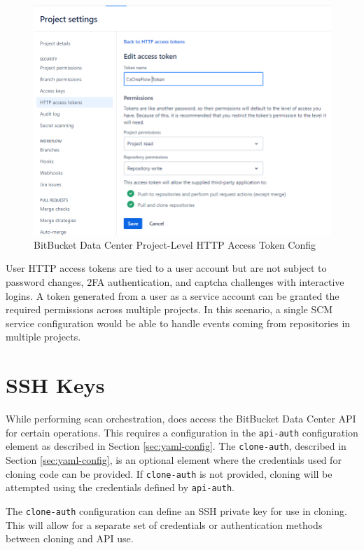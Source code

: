 \begin{figure}[ht]
    \includegraphics[width=\textwidth]{graphics/bbdc-token-config.png}
    \caption{BitBucket Data Center Project-Level HTTP Access Token Config}
    \label{fig:bbdc-token-config}
\end{figure}


User HTTP access tokens are tied to a user account but are not subject to password
changes, 2FA authentication, and captcha challenges with interactive logins.  A token generated
from a user as a service account can be granted the required permissions across multiple projects.
In this scenario, a single SCM service configuration would be able to handle events coming from
repositories in multiple projects.

\section{\cxoneflowtext\space SSH Keys}

While performing scan orchestration, \cxoneflow does access the BitBucket Data Center API for
certain operations.  This requires a configuration in the \texttt{api-auth} configuration
element as described in Section \ref{sec:yaml-config}.  The \texttt{clone-auth},
described in Section \ref{sec:yaml-config}, is an optional element where the credentials
used for cloning code can be provided.  If \texttt{clone-auth} is not provided, cloning will
be attempted using the credentials defined by \texttt{api-auth}.

The \texttt{clone-auth} configuration can define an SSH private key for use in cloning.  This
will allow for a separate set of credentials or authentication methods between cloning and
API use.


